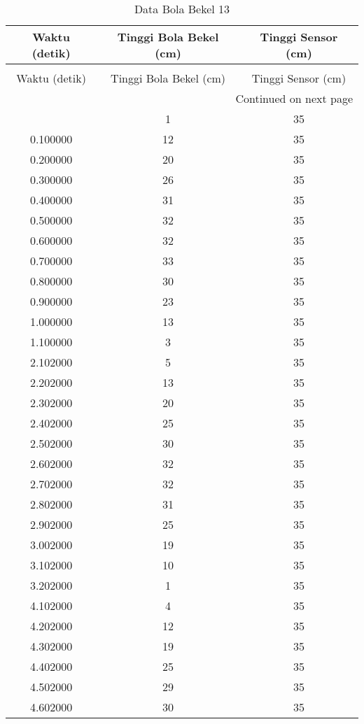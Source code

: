 \begin{longtable}[htbp]{|c|c|c|}
\caption{Data Bola Bekel 13} \\
\hline
Waktu (detik) & Tinggi Bola Bekel (cm) & Tinggi Sensor (cm) \\ \hline
\endfirsthead
\caption[]{Data Bola Bekel 13} \\
\hline
Waktu (detik) & Tinggi Bola Bekel (cm) & Tinggi Sensor (cm) \\ \hline
\endhead
\multicolumn{3}{r}{Continued on next page} \\
\endfoot
\endlastfoot
0.575000 & 1 & 35 \\ \hline
0.100000 & 12 & 35 \\ \hline
0.200000 & 20 & 35 \\ \hline
0.300000 & 26 & 35 \\ \hline
0.400000 & 31 & 35 \\ \hline
0.500000 & 32 & 35 \\ \hline
0.600000 & 32 & 35 \\ \hline
0.700000 & 33 & 35 \\ \hline
0.800000 & 30 & 35 \\ \hline
0.900000 & 23 & 35 \\ \hline
1.000000 & 13 & 35 \\ \hline
1.100000 & 3 & 35 \\ \hline
2.102000 & 5 & 35 \\ \hline
2.202000 & 13 & 35 \\ \hline
2.302000 & 20 & 35 \\ \hline
2.402000 & 25 & 35 \\ \hline
2.502000 & 30 & 35 \\ \hline
2.602000 & 32 & 35 \\ \hline
2.702000 & 32 & 35 \\ \hline
2.802000 & 31 & 35 \\ \hline
2.902000 & 25 & 35 \\ \hline
3.002000 & 19 & 35 \\ \hline
3.102000 & 10 & 35 \\ \hline
3.202000 & 1 & 35 \\ \hline
4.102000 & 4 & 35 \\ \hline
4.202000 & 12 & 35 \\ \hline
4.302000 & 19 & 35 \\ \hline
4.402000 & 25 & 35 \\ \hline
4.502000 & 29 & 35 \\ \hline
4.602000 & 30 & 35 \\ \hline

\end{longtable}
